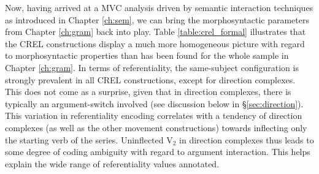 
Now, having arrived at a MVC analysis driven by semantic interaction techniques as introduced in Chapter \ref{ch:sem}, we can bring the morphosyntactic parameters from Chapter \ref{ch:gram} back into play. Table \ref{table:crel_formal} illustrates that the CREL constructions display a much more homogeneous picture with regard to morphosyntactic properties than has been found for the whole sample in Chapter \ref{ch:gram}. In terms of referentiality, the same-subject configuration is strongly prevalent in all CREL constructions, except for direction complexes. This does not come as a surprise, given that in direction complexes, there is typically an argument-switch involved (see discussion below in §\ref{sec:direction}). This variation in referentiality encoding correlates with a tendency of direction complexes (as well as the other movement constructions) towards inflecting only the starting verb of the series. Uninflected V$_2$ in direction complexes thus leads to some degree of coding ambiguity with regard to argument interaction. This helps explain the wide range of referentiality values annotated.

